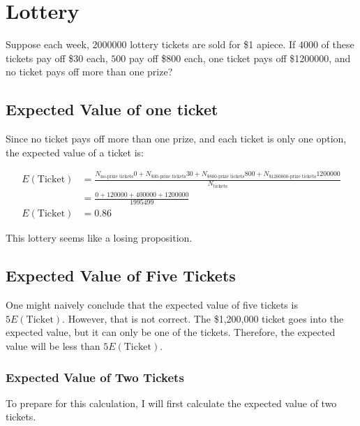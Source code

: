 \documentclass{article}
\begin{document}
\section{Lottery}

Suppose each week, $2000000$ lottery tickets are sold for \$1 apiece.
If $4000$ of these tickets pay off \$30 each,
	$500$ pay off \$800 each, one ticket pays off \$1200000,
	and no ticket pays off more than one prize?

\subsection{Expected Value of one ticket}

Since no ticket pays off more than one prize, and each ticket is only
	one option, the expected value of a ticket is:

\begin{align*}
E\left( \text{Ticket} \right)
	& = \frac{
		N_\text{no-prize tickets} 
			0
		+ N_\text{\$30-prize tickets}
			30
		+ N_\text{\$800-prize tickets} 800
		+ N_\text{\$1200000-prize tickets} 1200000}{N_\text{tickets}} \\
	& = \frac{0 + 120000 + 400000 + 1200000}{1995499}\\
E\left( \text{Ticket} \right)
	& = 0.86
\end{align*}

This lottery seems like a losing proposition.

\subsection{Expected Value of Five Tickets}

One might naively conclude that the expected value of five tickets
	is $5 E\left( \text{Ticket} \right)$.
However, that is not correct.
The \$1,200,000 ticket goes into the expected value, but it can only
	be one of the tickets.
Therefore, the expected value will be less than $5 E\left( \text{Ticket} \right)$.

\subsubsection{Expected Value of Two Tickets}

To prepare for this calculation, I will first calculate the expected value
	of two tickets.
\end{document}
